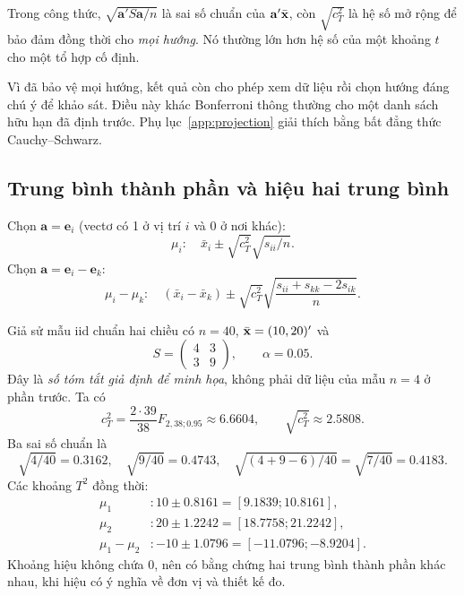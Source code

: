 Trong công thức, $\sqrt{\mathbf a'S\mathbf a/n}$ là sai số chuẩn của
$\mathbf a'\bar{\mathbf x}$, còn $\sqrt{c_T^2}$ là hệ số mở rộng để bảo đảm đồng
thời cho \emph{mọi hướng}. Nó thường lớn hơn hệ số của một khoảng $t$
cho một tổ hợp cố định.

Vì đã bảo vệ mọi hướng, kết quả còn cho phép xem dữ liệu rồi chọn hướng
đáng chú ý để khảo sát. Điều này khác Bonferroni thông thường cho một
danh sách hữu hạn đã định trước. Phụ lục~\ref{app:projection} giải thích
bằng bất đẳng thức Cauchy--Schwarz.

\subsection{Trung bình thành phần và hiệu hai trung bình}
Chọn $\mathbf a=\mathbf e_i$ (vectơ có 1 ở vị trí $i$ và 0 ở nơi khác):
\begin{equation}
 \mu_i:\quad\bar x_i\pm\sqrt{c_T^2}\sqrt{s_{ii}/n}.
 \label{eq:t2components}
\end{equation}
Chọn $\mathbf a=\mathbf e_i-\mathbf e_k$:
\begin{equation}
 \mu_i-\mu_k:\quad
 (\bar x_i-\bar x_k)\pm\sqrt{c_T^2}
 \sqrt{\frac{s_{ii}+s_{kk}-2s_{ik}}n}.
 \label{eq:t2difference}
\end{equation}


\begin{example}
Giả sử mẫu iid chuẩn hai chiều có $n=40$, $\bar{\mathbf x}=(10,20)'$ và
\begin{equation}
 S=\begin{pmatrix}4&3\\3&9\end{pmatrix},\qquad\alpha=0.05.
 \label{eq:intervaldata}
\end{equation}
Đây là \emph{số tóm tắt giả định để minh họa}, không phải dữ liệu của mẫu
$n=4$ ở phần trước. Ta có
\[
 c_T^2=\frac{2\cdot39}{38}F_{2,38;0.95}\approx6.6604,
 \qquad\sqrt{c_T^2}\approx2.5808.
\]
Ba sai số chuẩn là
\[
 \sqrt{4/40}=0.3162,\quad\sqrt{9/40}=0.4743,\quad
 \sqrt{(4+9-6)/40}=\sqrt{7/40}=0.4183.
\]
Các khoảng $T^2$ đồng thời:
\begin{align*}
 \mu_1 &: 10\pm0.8161=[9.1839;10.8161],\\
 \mu_2 &: 20\pm1.2242=[18.7758;21.2242],\\
 \mu_1-\mu_2 &: -10\pm1.0796=[-11.0796;-8.9204].
\end{align*}
Khoảng hiệu không chứa 0, nên có bằng chứng hai trung bình thành phần
khác nhau, khi hiệu có ý nghĩa về đơn vị và thiết kế đo.
\end{example}

